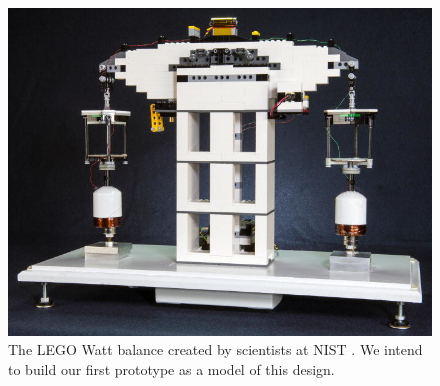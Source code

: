 \documentclass[aps,prstab,reprint,12pt]{revtex4-1}
\begin{document}
\begin{figure}[b]
     \centering\includegraphics[width=.95\linewidth]{figs/Lego_ Watt_Balance.jpeg}
     \caption{The LEGO Watt balance created by scientists at NIST \cite{Chao2015}. We intend to build our first prototype as a model of this design.}\label{fig:Lego_Watt_Balance}
\end{figure}




\end{document}
